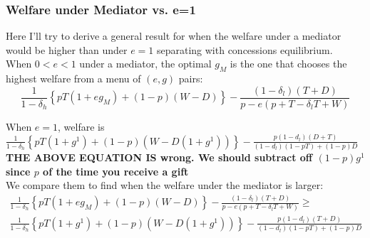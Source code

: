\documentclass[12pt]{article}
\newcommand{\de}{\delta}
\begin{document}
\subsubsection{Welfare under Mediator vs. e=1}
\label{sec:WM1}
Here I'll try to derive a general result for when the welfare under a mediator would be higher than under $e=1$ separating with concessions equilibrium. \\

When $0<e<1$ under a mediator, the optimal $g_M$ is the one that chooses the highest welfare from a menu of $(e,g)$ pairs:
$$\frac{1}{1-\de_h}\left\{pT(1+eg_M) + (1-p)(W-D)\right\} - \frac{\left(1 - \de_l \right) \left( T + D \right)}{p - e \left( p + T - \de_l T + W \right)}$$

When $e=1$, welfare is $\frac{1}{1-\de_h}\left\{pT(1+g^1) + (1-p)(W-D(1+g^1))\right\} - \frac{p(1-d_l)(D+T)}{(1-d_l)(1-pT)+(1-p)D}$ \\
\textbf{THE ABOVE EQUATION IS wrong. We should subtract off $(1-p)g^1$ since $p$ of the time you receive a gift} \\

We compare them to find when the welfare under the mediator is larger:
	\begin{multline*}
		\frac{1}{1-\de_h}\left\{pT(1+eg_M) + (1-p)(W-D)\right\} - \frac{\left(1 - \de_l \right) \left( T + D \right)}{p - e \left( p + T - \de_l T + W \right)} \geq \\
		\frac{1}{1-\de_h}\left\{pT(1+g^1) + (1-p)(W-D(1+g^1))\right\} - \frac{p(1-d_l)(T+D)}{(1-d_l)(1-pT)+(1-p)D}
	\end{multline*}						
		
\end{document}
